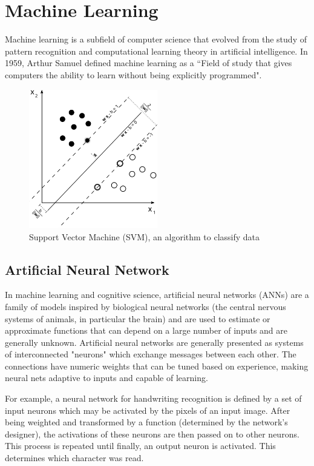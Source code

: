 \documentclass[14pt,a4paper]{extarticle}
\begin{document}
	\section{Machine Learning}
	
	Machine learning is a subfield of computer science that evolved from the study of pattern recognition and computational learning theory in artificial intelligence. In 1959, Arthur Samuel defined machine learning as a ``Field of study that gives computers the ability to learn without being explicitly programmed".
	
		\begin{figure}[H]
			\includegraphics[width=0.5\textwidth, center]{data_classification_svm.png}
			\caption{Support Vector Machine (SVM), an algorithm to classify data}
		\end{figure}
	
	\subsection{Artificial Neural Network}
	In machine learning and cognitive science, artificial neural networks (ANNs) are a family of models inspired by biological neural networks (the central nervous systems of animals, in particular the brain) and are used to estimate or approximate functions that can depend on a large number of inputs and are generally unknown. Artificial neural networks are generally presented as systems of interconnected "neurons" which exchange messages between each other. The connections have numeric weights that can be tuned based on experience, making neural nets adaptive to inputs and capable of learning.

For example, a neural network for handwriting recognition is defined by a set of input neurons which may be activated by the pixels of an input image. After being weighted and transformed by a function (determined by the network's designer), the activations of these neurons are then passed on to other neurons. This process is repeated until finally, an output neuron is activated. This determines which character was read.
\end{document}
